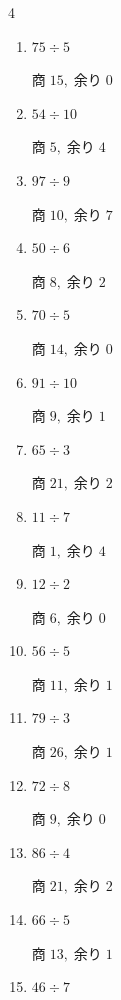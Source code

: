 \begin{multicols}{4}
\begin{enumerate}
        $商\; 6,\; 余り\; 3$

  \item $75 \div 5$

        $商\; 15,\; 余り\; 0$

  \item $54 \div 10$

        $商\; 5,\; 余り\; 4$

  \item $97 \div 9$

        $商\; 10,\; 余り\; 7$

  \item $50 \div 6$

        $商\; 8,\; 余り\; 2$

  \item $70 \div 5$

        $商\; 14,\; 余り\; 0$

  \item $91 \div 10$

        $商\; 9,\; 余り\; 1$

  \item $65 \div 3$

        $商\; 21,\; 余り\; 2$

  \item $11 \div 7$

        $商\; 1,\; 余り\; 4$

  \item $12 \div 2$

        $商\; 6,\; 余り\; 0$

  \item $56 \div 5$

        $商\; 11,\; 余り\; 1$

  \item $79 \div 3$

        $商\; 26,\; 余り\; 1$

  \item $72 \div 8$

        $商\; 9,\; 余り\; 0$

\columnbreak %

  \item $86 \div 4$

        $商\; 21,\; 余り\; 2$

  \item $66 \div 5$

        $商\; 13,\; 余り\; 1$

  \item $46 \div 7$


\end{enumerate}
\end{multicols}
